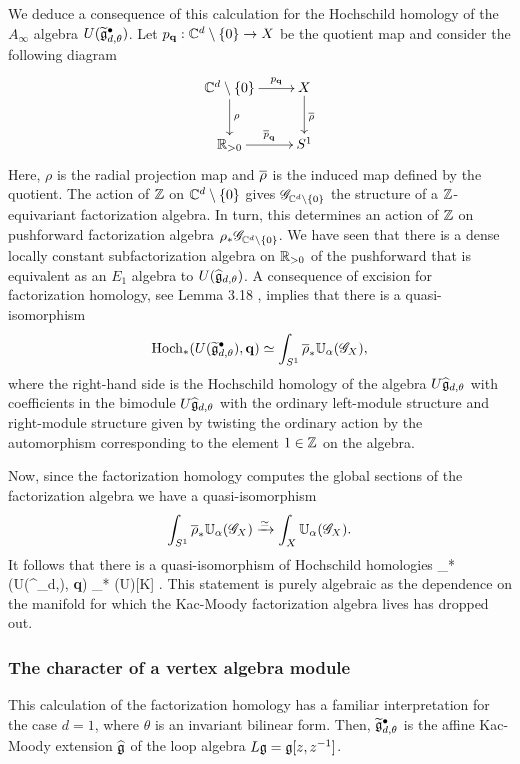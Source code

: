 We deduce a consequence of this calculation for the Hochschild homology of the $A_\infty$ algebra $U(\Tilde{\fg}^\bullet_{d,\theta})$.
Let $p_{\bf q} :  \CC^d \setminus \{0\} \to X$ be the quotient map and consider the following diagram
\[
\xymatrix{
\CC^d \setminus \{0\} \ar[r]^-{p_{\bf q}} \ar[d]^-{\rho} & X \ar[d]^{\Bar{\rho}} \\
\RR_{>0} \ar[r]^-{\Bar{p}_{\bf q}} & S^1
}
\]
Here, $\rho$ is the radial projection map and $\Bar{\rho}$ is the induced map defined by the quotient.
The action of $\ZZ$ on $\CC^d \setminus\{0\}$ gives $\sG_{\CC^d \setminus \{0\}}$ the structure of a $\ZZ$-equivariant factorization algebra. 
In turn, this determines an action of $\ZZ$ on pushforward factorization algebra $\rho_* \sG_{\CC^d \setminus \{0\}}$.
We have seen that there is a dense locally constant subfactorization algebra on $\RR_{>0}$ of the pushforward that is equivalent as an $E_1$ algebra to $U(\Hat{\fg}_{d,\theta})$.
A consequence of excision for factorization homology, see Lemma 3.18 \cite{AFTopMan}, implies that there is a quasi-isomorphism
\[
\Hoch_*(U(\Tilde{\fg}^\bullet_{d,\theta}), {\bf q}) \simeq \int_{S^1} \Bar{\rho}_* \UU_\alpha(\sG_X),
\]
where the right-hand side is the Hochschild homology of the algebra $U \Hat{\fg}_{d,\theta}$ with coefficients in the bimodule $U \Hat{\fg}_{d, \theta}$ with the ordinary left-module structure and right-module structure given by twisting the ordinary action by the automorphism corresponding to the element $1 \in \ZZ$ on the algebra.

Now, since the factorization homology computes the global sections of the factorization algebra we have a quasi-isomorphism
\[
\int_{S^1} \Bar{\rho}_* \UU_\alpha(\sG_X) \xto{\simeq} \int_X \UU_{\alpha} (\sG_X) .
\]
It follows that there is a quasi-isomorphism of Hochschild homologies
\beqn\label{hoch1}
\Hoch_*(U(\Tilde{\fg}^\bullet_{d,\theta}), {\bf q}) \simeq \Hoch_* (U\fg)[K] .
\eeqn
This statement is purely algebraic as the dependence on the manifold for which the Kac-Moody factorization algebra lives has dropped out.

\subsubsection{The character of a vertex algebra module}

This calculation of the factorization homology has a familiar interpretation for the case $d=1$, where $\theta$ is an invariant bilinear form. 
Then, $\Tilde{\fg}^\bullet_{d,\theta}$ is the affine Kac-Moody extension $\Hat{\fg}$ of the loop algebra $L\fg = \fg [z,z^{-1}]$. 

